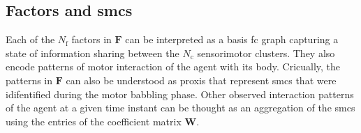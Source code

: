 \textbf{}

\subsection{Factors and \acp{smc}}
Each of the $N_\text{f}$ factors in $\bm{F}$ can be interpreted as a basis \ac{fc} graph capturing a state of information sharing between the $N_\text{c}$ sensorimotor clusters. They also encode patterns of motor interaction of the agent with its body. Cricually, the patterns in $\bm{F}$ can also be understood as proxis that represent \acp{smc} that were idifentified during the motor babbling phase. Other observed interaction patterns of the agent at a given time instant can be thought as an aggregation of the \acp{smc} using the entries of the coefficient matrix $\bm{W}$.

%





